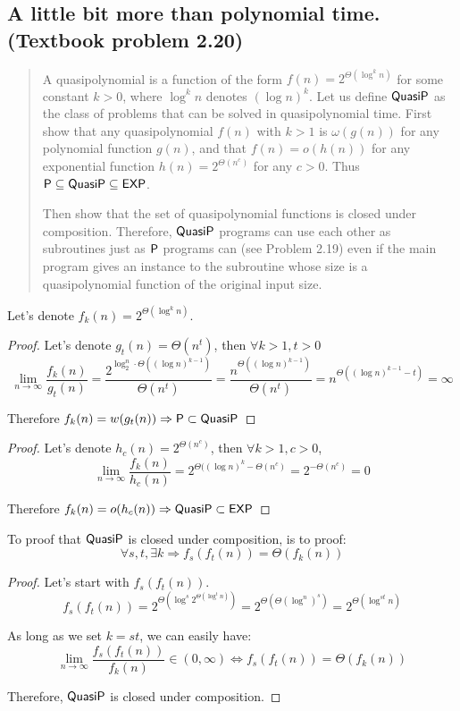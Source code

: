 \subsection*{A little bit more than polynomial time. (Textbook problem 2.20)}
    \begin{quote}
    A quasipolynomial is a function of the form $f(n) = 2^{\Theta(\log^k n)}$ for some constant $k > 0$, where $\log^k n$ denotes $(\log n)^k$.
    Let us define $\QuasiP$ as the class of problems that can be solved in quasipolynomial time.
    First show that any quasipolynomial $f(n)$ with $k > 1$ is $\omega(g(n))$ for any polynomial function $g(n)$,
    and that $f(n) = o(h(n))$ for any exponential function $h(n) = 2^{\Theta(n^c)}$ for any $c > 0$.
    Thus $\P \subseteq \QuasiP \subseteq \EXP$.

    Then show that the set of quasipolynomial functions is closed under composition.
    Therefore, $\QuasiP$ programs can use each other as subroutines just as $\P$ programs can (see Problem 2.19)
    even if the main program gives an instance to the subroutine whose size is a quasipolynomial function of the original input size.
    \end{quote}

 \solution

    Let's denote $f_k(n) =  2^{\Theta(\log^k n)}$.
\begin{proof}
    Let's denote $g_t(n) = \Theta(n^t)$, then $\forall k>1, t>0$
    $$\lim_{n \to \infty} \frac{f_k(n)}{g_t(n)} = \frac{2^{\log_2^n \cdot \Theta((\log n)^{k-1})}} {\Theta(n^t)} = \frac{n^{\Theta((\log n)^{k-1})}}{\Theta(n^t)} = n^{\Theta((\log n)^{k-1} - t)} = \infty$$

    Therefore $f_k(n) = w(g_t(n)) \Rightarrow \P \subset \QuasiP$
\end{proof}

\begin{proof}
    Let's denote $h_c(n) = 2^{\Theta(n^c)}$, then $\forall k>1, c>0$,
    $$\lim_{n \to \infty} \frac{f_k(n)}{h_c(n)} = 2^{\Theta((\log n)^k - \Theta(n^c)} = 2^{-\Theta(n^c)} = 0$$

    Therefore $f_k(n) = o(h_c(n)) \Rightarrow \QuasiP \subset \EXP$
\end{proof}

To proof that $\QuasiP$ is closed under composition, is to proof: 
    $$\forall s, t, \exists k \Rightarrow f_s(f_t(n)) = \Theta(f_k(n))$$
\begin{proof}
    Let's start with $f_s(f_t(n))$.
    $$f_s(f_t(n)) = 2^{\Theta(\log^s 2^{\Theta(\log^t n)})} = 2^{\Theta(\Theta(\log^ n)^s)} = 2^{\Theta(\log^{st} n)}$$

    As long as we set $k = st$, we can easily have:
    $$\lim_{n \to \infty} \frac{f_s(f_t(n))}{f_k(n)} \in (0, \infty) \Leftrightarrow f_s(f_t(n)) = \Theta(f_k(n))$$

    Therefore, $\QuasiP$ is closed under composition.
\end{proof}
